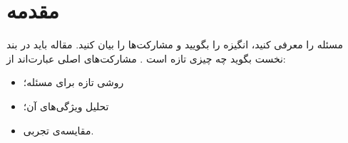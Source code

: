 \section{مقدمه}
مسئله را معرفی کنید، انگیزه را بگویید و مشارکت‌ها را بیان کنید. مقاله باید در بند نخست بگوید چه چیزی تازه است
\cite{lamport1994}. مشارکت‌های اصلی عبارت‌اند از:
\begin{itemize}
  \item روشی تازه برای مسئله؛
  \item تحلیل ویژگی‌های آن؛
  \item مقایسه‌ی تجربی.
\end{itemize}

